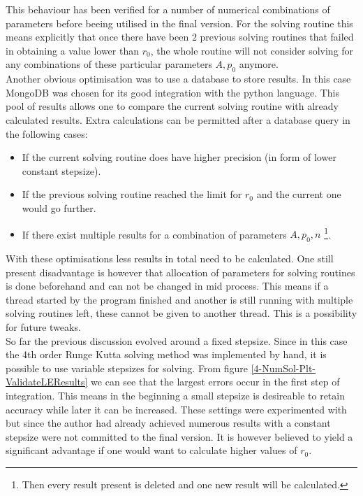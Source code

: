 \begin{appendix}
\begin{section}
This behaviour has been verified for a number of numerical combinations of parameters before beeing utilised in the final version.
For the solving routine this means explicitly that once there have been $2$ previous solving routines that failed in obtaining a value lower than $r_0$, the whole routine will not consider solving for any combinations of these particular parameters $A,p_0$ anymore.\\
Another obvious optimisation was to use a database to store results.
In this case MongoDB \cite{dirolfPymongo11Python2021} was chosen for its good integration with the python language. 
This pool of results allows one to compare the current solving routine with already calculated results.
Extra calculations can be permitted after a database query in the following cases:
\begin{itemize}
	\item If the current solving routine does have higher precision (in form of lower constant stepsize).
	\item If the previous solving routine reached the limit for $r_0$ and the current one would go further.
	\item If there exist multiple results for a combination of parameters $A,p_0,n$ \footnote{Then every result present is deleted and one new result will be calculated.}.
\end{itemize}
With these optimisations less results in total need to be calculated.
One still present disadvantage is however that allocation of parameters for solving routines is done beforehand and can not be changed in mid process.
This means if a thread started by the program finished and another is still running with multiple solving routines left, these cannot be given to another thread.
This is a possibility for future tweaks.\\
So far the previous discussion evolved around a fixed stepsize.
Since in this case the 4th order Runge Kutta solving method was implemented by hand, it is possible to use variable stepsizes for solving.
From figure \ref{4-NumSol-Plt-ValidateLEResults} we can see that the largest errors occur in the first step of integration. 
This means in the beginning a small stepsize is desireable to retain accuracy while later it can be increased. 
These settings were experimented with but since the author had already achieved numerous results with a constant stepsize were not committed to the final version.
It is however believed to yield a significant advantage if one would want to calculate higher values of $r_0$.
\end{section}
\end{appendix}
